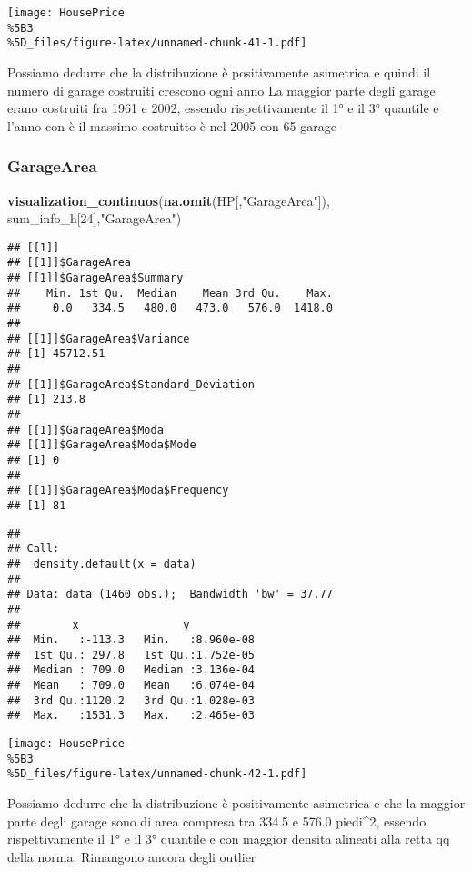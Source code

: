\documentclass[
]{article}
\newenvironment{Shaded}{\begin{snugshade}}{\end{snugshade}}
\newcommand{\DecValTok}[1]{\textcolor[rgb]{0.00,0.00,0.81}{#1}}
\newcommand{\FunctionTok}[1]{\textcolor[rgb]{0.13,0.29,0.53}{\textbf{#1}}}
\newcommand{\NormalTok}[1]{#1}
\newcommand{\StringTok}[1]{\textcolor[rgb]{0.31,0.60,0.02}{#1}}
\begin{document}
\texttt{[image: HousePrice\\\%5B3\\\%5D\_files/figure-latex/unnamed-chunk-41-1.pdf]}

Possiamo dedurre che la distribuzione è positivamente asimetrica e
quindi il numero di garage costruiti crescono ogni anno La maggior parte
degli garage erano costruiti fra 1961 e 2002, essendo rispettivamente il
1° e il 3° quantile e l'anno con è il massimo costruitto è nel 2005 con
65 garage

\subsubsection{GarageArea}\label{garagearea}

\begin{Shaded}
\begin{Highlighting}[]
\FunctionTok{visualization\_continuos}\NormalTok{(}\FunctionTok{na.omit}\NormalTok{(HP[,}\StringTok{"GarageArea"}\NormalTok{]), sum\_info\_h[}\DecValTok{24}\NormalTok{],}\StringTok{"GarageArea"}\NormalTok{)}
\end{Highlighting}
\end{Shaded}

\begin{verbatim}
## [[1]]
## [[1]]$GarageArea
## [[1]]$GarageArea$Summary
##    Min. 1st Qu.  Median    Mean 3rd Qu.    Max. 
##     0.0   334.5   480.0   473.0   576.0  1418.0 
## 
## [[1]]$GarageArea$Variance
## [1] 45712.51
## 
## [[1]]$GarageArea$Standard_Deviation
## [1] 213.8
## 
## [[1]]$GarageArea$Moda
## [[1]]$GarageArea$Moda$Mode
## [1] 0
## 
## [[1]]$GarageArea$Moda$Frequency
## [1] 81
\end{verbatim}

\begin{verbatim}
## 
## Call:
##  density.default(x = data)
## 
## Data: data (1460 obs.);  Bandwidth 'bw' = 37.77
## 
##        x                y            
##  Min.   :-113.3   Min.   :8.960e-08  
##  1st Qu.: 297.8   1st Qu.:1.752e-05  
##  Median : 709.0   Median :3.136e-04  
##  Mean   : 709.0   Mean   :6.074e-04  
##  3rd Qu.:1120.2   3rd Qu.:1.028e-03  
##  Max.   :1531.3   Max.   :2.465e-03
\end{verbatim}

\texttt{[image: HousePrice\\\%5B3\\\%5D\_files/figure-latex/unnamed-chunk-42-1.pdf]}

Possiamo dedurre che la distribuzione è positivamente asimetrica e che
la maggior parte degli garage sono di area compresa tra 334.5 e 576.0
piedi\^{}2, essendo rispettivamente il 1° e il 3° quantile e con maggior
densita alineati alla retta qq della norma. Rimangono ancora degli
outlier
\end{document}
